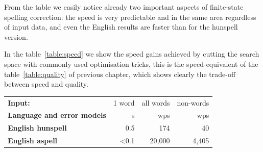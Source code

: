 \documentclass[a4paper,12pt]{article}
\begin{document}
From the table we easily notice already two important aspects of finite-state
spelling correction: the speed is very predictable and in the same area
regardless of input data, and even the English results are faster than for the
hunspell version. 

In the table~\ref{table:speed} we show the speed gains achieved by
cutting the search space with commonly used optimisation tricks, this is the
speed-equivalent of the table~\ref{table:quality} of previous
chapter, which shows clearly the trade-off between speed and quality.

\begin{table}
    \centering
    \begin{tabular}{|l|r|r|r|}
        \hline
        \bf Input:                    & 1 word & all words & non-words \\
        \bf Language and error models & s      & wps       & wps       \\
        \hline
        \bf English hunspell & 0.5 & 174 & 40 \\
          \bf English aspell & <0.1 & 20,000 & 4,405 \\


\end{tabular}
\end{table}
\end{document}
